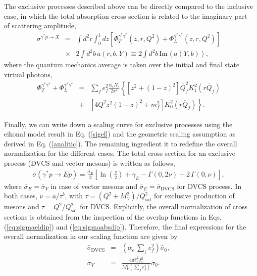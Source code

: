 \documentclass[twocolumn,showpacs,preprintnumbers,amsmath,amssymb,showkeys,aps,prd,a4paper,byrevtex]{revtex4}
\begin{document}
The exclusive processes described above can be directly compared to the inclusive case, in which the total absorption cross section is related to the imaginary part of scattering amplitude,
\begin{eqnarray}
\sigma^{\gamma^*p\rightarrow X} & = & \int
  d^2r \int_0^1 dz \left[\Phi^{\gamma^*\gamma^*}_T(z,r,Q^2) + \Phi^{\gamma^*\gamma^*}_L(z,r,Q^2) \right] \nonumber \\
&\times &  2 \int d^2b \,a(r,b,Y) \equiv 2\int d^2b\,\mathrm{Im}\left\langle a(Y,b) \right\rangle ,
\label{eq:sigmaabsdip} 
\end{eqnarray}
where the quantum mechanics average is taken over the initial and final state virtual photons,
\begin{eqnarray}
 \Phi^{\gamma^*\gamma^*}_T+\Phi^{\gamma^*\gamma^*}_L
    &=& \sum_f e_f^2 \frac{\alpha_e N_c}{2\pi^2}\left \{[z^2+(1-z)^2]\bar Q_f^2 K_1^2(r\bar Q_f) \right. \nonumber \\
&+ & \left.\left[ 4 Q^2 z^2(1-z)^2 + m_f^2\right] K_0^2(r\bar 
Q_f) \right \}.
\end{eqnarray}

Finally, we can write down a scaling curve for exclusive processes using the eikonal model result in Eq. (\ref{sigel}) and the geometric scaling assumption as derived in Eq. (\ref{analitic}).  The remaining ingredient it to redefine the overall normalization for the different cases. The total cross section for an exclusive process (DVCS and vector mesons) is written  as follows, 
\begin{eqnarray}
\sigma (\gamma^*p\rightarrow Ep)  =  \frac{\bar{\sigma}_E}{2}\left[\ln \left(\frac{\nu}{2}\right) +\gamma_E-\Gamma\left(0,2\nu \right) + 2\,\Gamma\left(0,\nu \right)  \right],\label{sigexcl}
\end{eqnarray}
where $\bar{\sigma}_E = \bar{\sigma}_V$ in case of vector mesons and $\bar{\sigma}_E = \bar{\sigma}_{\mathrm{DVCS}}$  for DVCS process. In both cases, $\nu = a/\tau^b$, with $\tau = (Q^2 + M_V^2)/Q^2_\mathrm{sat}$ for exclusive production of mesons and $\tau = Q^2/Q^2_\mathrm{sat}$ for DVCS. Explicitly, the overall normalization of cross sections is obtained from the inspection of the overlap functions in Eqs. (\ref{eq:sigmaeldip}) and (\ref{eq:sigmaabsdip}). Therefore, the final expressions for the overall normalization in our scaling function are given by
\begin{eqnarray}
\label{sig0dvcs}
\bar{\sigma}_{\mathrm{DVCS}} & = & \left(\alpha_e\,\sum_f e_f^2  \right)\bar{\sigma}_0, \\
\label{sig0v}
\bar{\sigma}_V & = & \frac{4\pi \hat{e}^2_ff_V^2}{M_V^2\left(\sum_f e_f^2 \right)}\bar{\sigma}_0.
\end{eqnarray}
\end{document}
